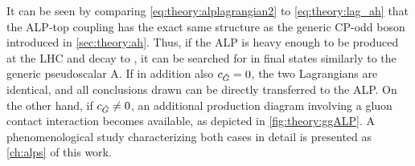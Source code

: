 It can be seen by comparing \cref{eq:theory:alplagrangian2} to \cref{eq:theory:lag_ah} that the ALP-top coupling has the exact same structure as the generic CP-odd boson introduced in \cref{sec:theory:ah}. Thus, if the ALP is heavy enough to be produced at the LHC and decay to \ttbar, it can be searched for in \ttbar final states similarly to the generic pseudoscalar A. If in addition also $c_{\tilde{G}} = 0$, the two Lagrangians are identical, and all conclusions drawn can be directly transferred to the ALP. On the other hand, if $c_{\tilde{G}} \neq 0$, an additional production diagram involving a gluon contact interaction becomes available, as depicted in \cref{fig:theory:ggALP}. A phenomenological study characterizing both cases in detail is presented as \cref{ch:alps} of this work.


